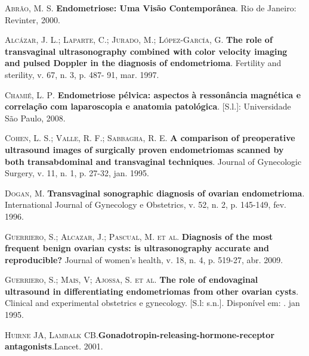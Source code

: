 \documentclass[12pt]{article} %
\begin{document}
\textsc{Abrão, M. S}.\textbf{ Endometriose: Uma Visão Contemporânea}. Rio de Janeiro: Revinter, 2000.

\vspace{0,5cm}

\textsc{Alcázar, J. L.; Laparte, C.; Jurado, M.; López-García, G}.\textbf{ The role of transvaginal ultrasonography combined with color velocity imaging and pulsed Doppler in the diagnosis of endometrioma}. Fertility and sterility, v. 67, n. 3, p. 487- 91, mar. 1997.

\vspace{0,5cm}

\textsc{Chamié, L. P}.\textbf{ Endometriose pélvica: aspectos à ressonância magnética e correlação com laparoscopia e anatomia patológica}. [S.l.]: Universidade São Paulo, 2008.

\vspace{0,5cm}

\textsc{Cohen, L. S.; Valle, R. F.; Sabbagha, R. E}.\textbf{ A comparison of preoperative ultrasound images of surgically proven endometriomas scanned by both transabdominal and transvaginal techniques}. Journal of Gynecologic Surgery, v. 11, n. 1, p. 27-32, jan. 1995.

\vspace{0,5cm}

\textsc{Dogan, M}.\textbf{ Transvaginal sonographic diagnosis of ovarian endometrioma}. International Journal of Gynecology e Obstetrics, v. 52, n. 2, p. 145-149, fev. 1996.

\vspace{0,5cm}

\textsc{Guerriero, S.; Alcazar, J.; Pascual, M. et al}.\textbf{ Diagnosis of the most frequent benign ovarian cysts: is ultrasonography accurate and reproducible?} Journal of women’s health, v. 18, n. 4, p. 519-27, abr. 2009.

\vspace{0,5cm}

\textsc{Guerriero, S.; Mais, V; Ajossa, S. et al}.\textbf{ The role of endovaginal ultrasound in differentiating endometriomas from other ovarian cysts}. Clinical and experimental obstetrics e gynecology. [S.l: s.n.]. Disponível em: . jan 1995.

\vspace{0,5cm}

\textsc{Huirne JA, Lambalk CB}.\textbf{Gonadotropin-releasing-hormone-receptor antagonists}.Lancet. 2001.

\vspace{0,5cm}
\end{document}
